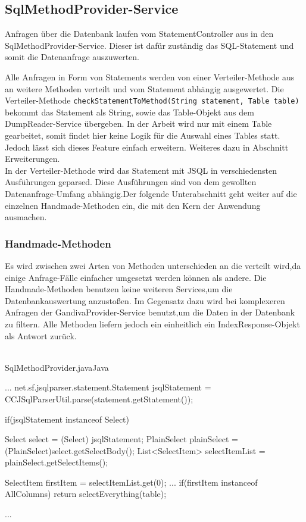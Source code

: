 \subsection{SqlMethodProvider-Service}
\label{SqlMethodProvider-Service}
Anfragen über die Datenbank laufen vom StatementController aus in den SqlMethodProvider-Service. Dieser ist dafür zuständig das SQL-Statement und somit die Datenanfrage auszuwerten.

Alle Anfragen in Form von Statements werden von einer Verteiler-Methode aus an weitere Methoden verteilt und vom Statement abhängig ausgewertet.
Die Verteiler-Methode \texttt{checkStatementToMethod(String statement, Table table)} bekommt das Statement als String, sowie das Table-Objekt aus dem DumpReader-Service übergeben. In der Arbeit wird nur mit einem Table gearbeitet, somit findet hier keine Logik für die Auswahl eines Tables statt. Jedoch lässt sich dieses Feature einfach erweitern. Weiteres dazu in Abschnitt Erweiterungen.\\

In der Verteiler-Methode wird das Statement mit JSQL in verschiedensten Ausführungen geparsed. Diese Ausführungen sind von dem gewollten Datenanfrage-Umfang abhängig.Der folgende Unterabschnitt geht weiter auf die einzelnen Handmade-Methoden ein, die mit den Kern der Anwendung ausmachen.


\subsubsection{Handmade-Methoden}


Es wird zwischen zwei Arten von Methoden unterschieden an die verteilt wird,da einige Anfrage-Fälle einfacher umgesetzt werden können als andere.
Die Handmade-Methoden benutzen keine weiteren Services,um die Datenbankauswertung anzustoßen. Im Gegensatz dazu wird bei komplexeren Anfragen der GandivaProvider-Service benutzt,um die Daten in der Datenbank zu filtern.
Alle Methoden liefern jedoch ein einheitlich ein IndexResponse-Objekt als Antwort zurück.\\\\

\begin{codeblock}{SqlMethodProvider.java}{Java}
  \begin{javacode}
    ...
net.sf.jsqlparser.statement.Statement jsqlStatement = CCJSqlParserUtil.parse(statement.getStatement()); 

if(jsqlStatement instanceof Select) {

            Select select = (Select) jsqlStatement;
            PlainSelect plainSelect = (PlainSelect)select.getSelectBody();
            List<SelectItem> selectItemList = plainSelect.getSelectItems();

            SelectItem firstItem = selectItemList.get(0);
			...
            if(firstItem instanceof AllColumns){
                return selectEverything(table);
            }
}
    ...
  \end{javacode}
\end{codeblock}


